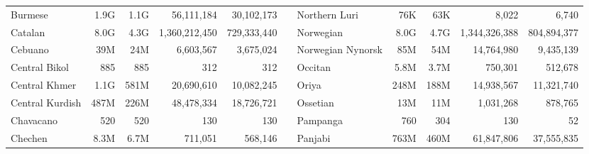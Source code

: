 \begin{table*}[t!]
{\begin{tabular}{@{}lrrrrclrrrr@{}}
            Burmese                   & 1.9G                     & 1.1G                      & 56,111,184               & 30,102,173                &                          & Northern Luri             & 76K                      & 63K                       & 8,022                    & 6,740                     \\
            Catalan                   & 8.0G                     & 4.3G                      & 1,360,212,450            & 729,333,440               &                          & Norwegian                 & 8.0G                     & 4.7G                      & 1,344,326,388            & 804,894,377               \\
            Cebuano                   & 39M                      & 24M                       & 6,603,567                & 3,675,024                 &                          & Norwegian Nynorsk         & 85M                      & 54M                       & 14,764,980               & 9,435,139                 \\
            Central Bikol             & 885                      & 885                       & 312                      & 312                       &                          & Occitan                   & 5.8M                     & 3.7M                      & 750,301                  & 512,678                   \\
            Central Khmer             & 1.1G                     & 581M                      & 20,690,610               & 10,082,245                &                          & Oriya                     & 248M                     & 188M                      & 14,938,567               & 11,321,740                \\
            Central Kurdish           & 487M                     & 226M                      & 48,478,334               & 18,726,721                &                          & Ossetian                  & 13M                      & 11M                       & 1,031,268                & 878,765                   \\
            Chavacano                 & 520                      & 520                       & 130                      & 130                       &                          & Pampanga                  & 760                      & 304                       & 130                      & 52                        \\
            Chechen                   & 8.3M                     & 6.7M                      & 711,051                  & 568,146                   &                          & Panjabi                   & 763M                     & 460M                      & 61,847,806               & 37,555,835                \\

\end{tabular}}
\end{table*}
